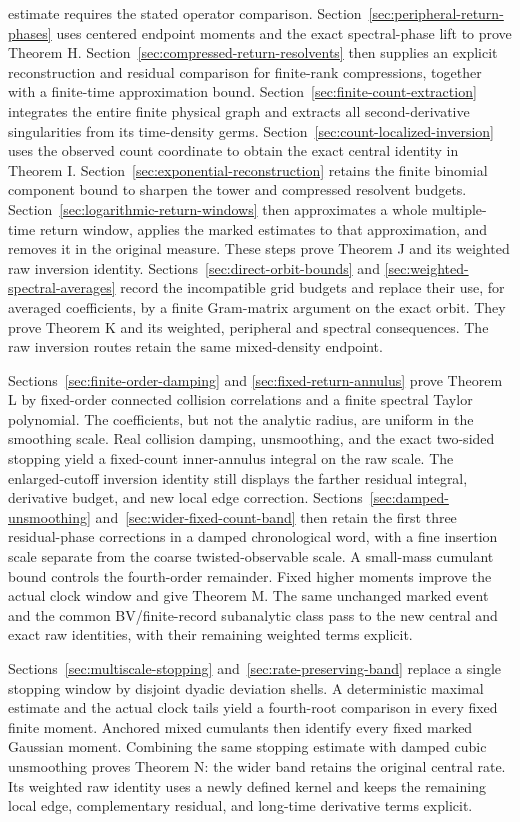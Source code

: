 \documentclass[11pt,reqno]{amsart}
\numberwithin{equation}{section}
\theoremstyle{definition}\newtheorem{definition}[theorem]{Definition}
\theoremstyle{remark}\newtheorem{remark}[theorem]{Remark}
\begin{document}
estimate requires the stated operator comparison.
Section~\ref{sec:peripheral-return-phases} uses centered endpoint
moments and the exact spectral-phase lift to prove Theorem H.
Section~\ref{sec:compressed-return-resolvents} then supplies an explicit
reconstruction and residual comparison for finite-rank compressions,
together with a finite-time approximation bound.
Section~\ref{sec:finite-count-extraction} integrates the entire finite
physical graph and extracts all second-derivative singularities from its
time-density germs. Section~\ref{sec:count-localized-inversion} uses
the observed count coordinate to obtain the exact central identity in
Theorem I. Section~\ref{sec:exponential-reconstruction} retains the
finite binomial component bound to sharpen the tower and compressed
resolvent budgets. Section~\ref{sec:logarithmic-return-windows} then
approximates a whole multiple-time return window, applies the marked
estimates to that approximation, and removes it in the original
measure. These steps prove Theorem J and its weighted raw inversion
identity. Sections~\ref{sec:direct-orbit-bounds} and
\ref{sec:weighted-spectral-averages} record the incompatible grid
budgets and replace their use, for averaged coefficients, by a finite
Gram-matrix argument on the exact orbit. They prove Theorem K and its
weighted, peripheral and spectral consequences. The raw inversion
routes retain the same mixed-density endpoint.

Sections~\ref{sec:finite-order-damping} and
\ref{sec:fixed-return-annulus} prove Theorem L by fixed-order connected
collision correlations and a finite spectral Taylor polynomial. The
coefficients, but not the analytic radius, are uniform in the smoothing
scale. Real collision damping, unsmoothing, and the exact two-sided
stopping yield a fixed-count inner-annulus integral on the raw scale.
The enlarged-cutoff inversion identity still displays the farther
residual integral, derivative budget, and new local edge correction.
Sections~\ref{sec:damped-unsmoothing} and~\ref{sec:wider-fixed-count-band}
then retain the first three residual-phase corrections in a damped
chronological word, with a fine insertion scale separate from the
coarse twisted-observable scale. A small-mass cumulant bound controls
the fourth-order remainder. Fixed higher moments improve the actual
clock window and give Theorem M. The same unchanged marked event and
the common BV/finite-record subanalytic class pass to the new central
and exact raw identities, with their remaining weighted terms explicit.


Sections~\ref{sec:multiscale-stopping} and~\ref{sec:rate-preserving-band}
replace a single stopping window by disjoint dyadic deviation shells.
A deterministic maximal estimate and the actual clock tails yield a
fourth-root comparison in every fixed finite moment. Anchored mixed
cumulants then identify every fixed marked Gaussian moment. Combining
the same stopping estimate with damped cubic unsmoothing proves Theorem N:
the wider band retains the original central rate. Its weighted raw
identity uses a newly defined kernel and keeps the remaining local edge,
complementary residual, and long-time derivative terms explicit.
\end{document}
